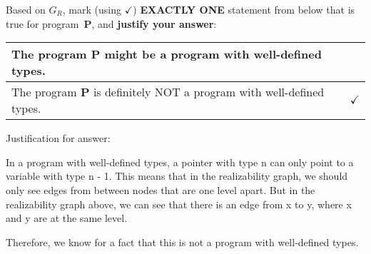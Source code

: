 \documentclass[12pt]{article}
\begin{document}
\begin{enumerate}
\begin{center}
\begin{tikzpicture}[auto,
        node distance=1.4cm, 
        ]
        \end{tikzpicture}
      \end{center}
      \vspace{-1ex}
        Based on $G_R$, mark (using $\checkmark$) \textbf{EXACTLY ONE} statement
        from below that is true for program~\textbf{P}, and \textbf{justify your
        answer}:
        \vspace{-2ex}
        \renewcommand{\arraystretch}{1.5}
        \begin{center}
        \begin{tabular}{|l|l|}
          \hline
          The program \textbf{P} might be a program with well-defined types. & \hspace{3em} \\ \hline
          The program \textbf{P} is definitely NOT a program with well-defined types. & $\checkmark$ \\ \hline 
        \end{tabular}
      \end{center}
      \vspace{-2ex}
       \begin{mdframed}
        Justification for answer:

        In a program with well-defined types, a pointer with type n can only point to a variable with type n - 1. This means that in the realizability graph, we should only see edges from between nodes that are one level apart. But in the realizability graph above, we can see that there is an edge from x to y, where x and y are at the same level.

        Therefore, we know for a fact that this is not a program with well-defined types.
       \end{mdframed}
    

    \end{enumerate}
    
\end{document}
